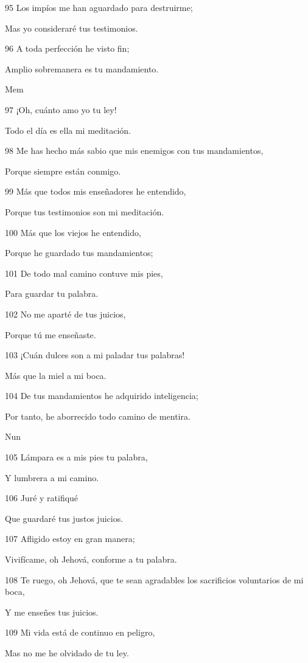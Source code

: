\par 95 Los impíos me han aguardado para destruirme;
\par Mas yo consideraré tus testimonios.
\par 96 A toda perfección he visto fin;
\par Amplio sobremanera es tu mandamiento.
\par Mem
\par 97 ¡Oh, cuánto amo yo tu ley!
\par Todo el día es ella mi meditación.
\par 98 Me has hecho más sabio que mis enemigos con tus mandamientos,
\par Porque siempre están conmigo.
\par 99 Más que todos mis enseñadores he entendido,
\par Porque tus testimonios son mi meditación.
\par 100 Más que los viejos he entendido,
\par Porque he guardado tus mandamientos;
\par 101 De todo mal camino contuve mis pies,
\par Para guardar tu palabra.
\par 102 No me aparté de tus juicios,
\par Porque tú me enseñaste.
\par 103 ¡Cuán dulces son a mi paladar tus palabras!
\par Más que la miel a mi boca.
\par 104 De tus mandamientos he adquirido inteligencia;
\par Por tanto, he aborrecido todo camino de mentira.
\par Nun
\par 105 Lámpara es a mis pies tu palabra,
\par Y lumbrera a mi camino.
\par 106 Juré y ratifiqué
\par Que guardaré tus justos juicios.
\par 107 Afligido estoy en gran manera;
\par Vivifícame, oh Jehová, conforme a tu palabra.
\par 108 Te ruego, oh Jehová, que te sean agradables los sacrificios voluntarios de mi boca,
\par Y me enseñes tus juicios.
\par 109 Mi vida está de continuo en peligro,
\par Mas no me he olvidado de tu ley.
